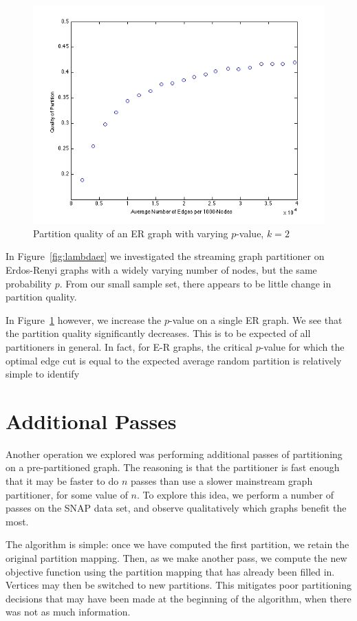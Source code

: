 \begin{figure}[h!]
\centering
  \includegraphics[width=0.8\columnwidth]{figures/varied_er_p.png}
  \caption{Partition quality of an ER graph with varying $p$-value, $k=2$}
  \label{fig:lambdap}
\end{figure}



In Figure~\ref{fig:lambdaer} we investigated the streaming graph partitioner on Erdos-Renyi graphs with a widely varying number of nodes, but the same probability $p$. From our small sample set, there appears to be little change in partition quality. 

In Figure~\ref{fig:lambdap} however, we increase the $p$-value on a single ER graph. We see that the partition quality significantly decreases. This is to be expected of all partitioners in general. In fact, for E-R graphs, the critical $p$-value for which the optimal edge cut is equal to the expected average random partition is relatively simple to identify~\cite{journals/cj/GanleyH94}

\section{Additional Passes}
Another operation we explored was performing additional passes of partitioning on a pre-partitioned graph. The reasoning is that the partitioner is fast enough that it may be faster to do $n$ passes than use a slower mainstream graph partitioner, for some value of $n$. To explore this idea, we perform a number of passes on the SNAP data set, and observe qualitatively which graphs benefit the most. 

The algorithm is simple: once we have computed the first partition, we retain the original partition mapping. Then, as we make another pass, we compute the new objective function using the partition mapping that has already been filled in. Vertices may then be switched to new partitions. This mitigates poor partitioning decisions that may have been made at the beginning of the algorithm, when there was not as much information. 

